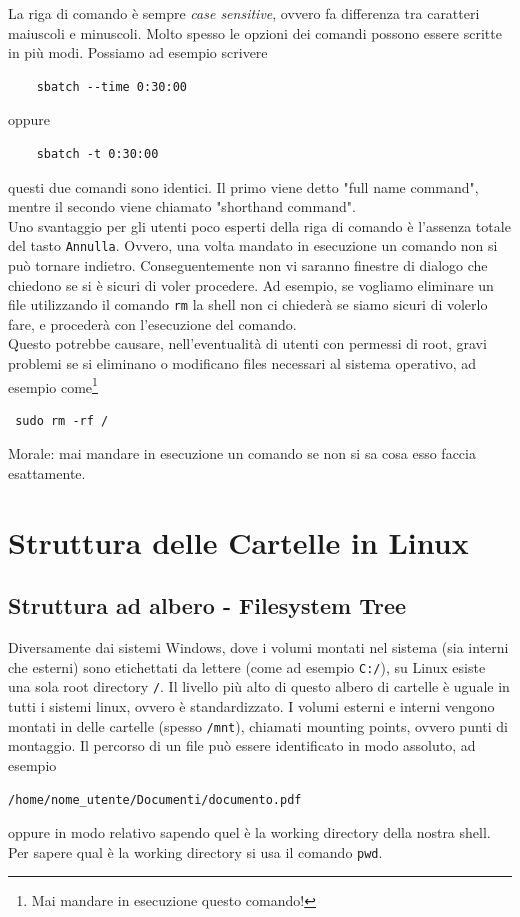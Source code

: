 \documentclass[11pt]{book}
\begin{document}
La riga di comando è sempre \textit{case sensitive}, ovvero fa differenza tra caratteri maiuscoli e minuscoli. Molto spesso le opzioni dei comandi possono essere scritte in più modi. Possiamo ad esempio scrivere
\begin{verbatim}
	sbatch --time 0:30:00
\end{verbatim}
oppure 
\begin{verbatim}
	sbatch -t 0:30:00
\end{verbatim}
questi due comandi sono identici. Il primo viene detto "full name command", mentre il secondo viene chiamato "shorthand command".\\
Uno svantaggio per gli utenti poco esperti della riga di comando è l'assenza totale del tasto \verb"Annulla". Ovvero, una volta mandato in esecuzione un comando non si può tornare indietro. Conseguentemente non vi saranno finestre di dialogo che chiedono se si è sicuri di voler procedere. Ad esempio, se vogliamo eliminare un file utilizzando il comando \verb"rm" la shell non ci chiederà se siamo sicuri di volerlo fare, e procederà con l'esecuzione del comando.\\
Questo potrebbe causare, nell'eventualità di utenti con permessi di root, gravi problemi se si eliminano o modificano files necessari al sistema operativo, ad esempio come\footnote{Mai mandare in esecuzione questo comando!}
\begin{verbatim}
 sudo rm -rf /
\end{verbatim}
Morale: mai mandare in esecuzione un comando se non si sa cosa esso faccia esattamente. 

\chapter{Struttura delle Cartelle in Linux}
\section{Struttura ad albero - Filesystem Tree}
Diversamente dai sistemi Windows, dove i volumi montati nel sistema (sia interni che esterni) sono etichettati da lettere (come ad esempio \verb"C:/"), su Linux esiste una sola root directory \verb"/". Il livello più alto di questo albero di cartelle è uguale in tutti i sistemi linux, ovvero è standardizzato. I volumi esterni e interni vengono montati in delle cartelle (spesso \verb"/mnt"), chiamati mounting points, ovvero punti di montaggio. Il percorso di un file può essere identificato in modo assoluto, ad esempio 
\begin{verbatim}
/home/nome_utente/Documenti/documento.pdf
\end{verbatim}
oppure in modo relativo sapendo quel è la working directory della nostra shell. Per sapere qual è la working directory si usa il comando \verb"pwd".
\end{document}
